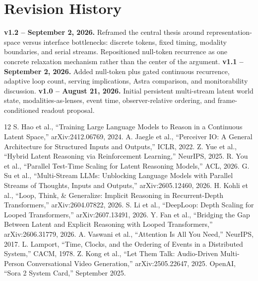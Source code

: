 \documentclass[10pt,twocolumn]{article}
\begin{document}
\section*{Revision History}
\textbf{v1.2 -- September 2, 2026.} Reframed the central thesis around representation-space versus interface bottlenecks: discrete tokens, fixed timing, modality boundaries, and serial streams. Repositioned null-token recurrence as one concrete relaxation mechanism rather than the center of the argument.
\textbf{v1.1 -- September 2, 2026.} Added null-token plus gated continuous recurrence, adaptive loop count, serving implications, Astra comparison, and monitorability discussion.
\textbf{v1.0 -- August 21, 2026.} Initial persistent multi-stream latent world state, modalities-as-lenses, event time, observer-relative ordering, and frame-conditioned readout proposal.
\begin{thebibliography}{12}\small
{} S. Hao et al., ``Training Large Language Models to Reason in a Continuous Latent Space,'' arXiv:2412.06769, 2024.
 A. Jaegle et al., ``Perceiver IO: A General Architecture for Structured Inputs and Outputs,'' ICLR, 2022.
 Z. Yue et al., ``Hybrid Latent Reasoning via Reinforcement Learning,'' NeurIPS, 2025.
 R. You et al., ``Parallel Test-Time Scaling for Latent Reasoning Models,'' ACL, 2026.
 G. Su et al., ``Multi-Stream LLMs: Unblocking Language Models with Parallel Streams of Thoughts, Inputs and Outputs,'' arXiv:2605.12460, 2026.
 H. Kohli et al., ``Loop, Think, \& Generalize: Implicit Reasoning in Recurrent-Depth Transformers,'' arXiv:2604.07822, 2026.
 S. Li et al., ``DeepLoop: Depth Scaling for Looped Transformers,'' arXiv:2607.13491, 2026.
 Y. Fan et al., ``Bridging the Gap Between Latent and Explicit Reasoning with Looped Transformers,'' arXiv:2606.31779, 2026.
 A. Vaswani et al., ``Attention Is All You Need,'' NeurIPS, 2017.
 L. Lamport, ``Time, Clocks, and the Ordering of Events in a Distributed System,'' CACM, 1978.
 Z. Kong et al., ``Let Them Talk: Audio-Driven Multi-Person Conversational Video Generation,'' arXiv:2505.22647, 2025.
 OpenAI, ``Sora 2 System Card,'' September 2025.
\end{thebibliography}
\end{document}
